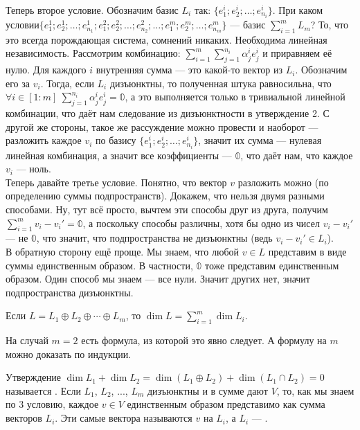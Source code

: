 \documentclass{article}
\begin{document}
\begin{itemize}
\begin{Proof}
            Теперь второе условие. Обозначим базис $L_i$ так: $\{e^i_1;e^i_2;\ldots;e^i_{n_i}\}$. При каком условии\newline$\{e^1_1;e^1_2;\ldots;e^1_{n_1};e^2_1;e^2_2;\ldots;e^2_{n_2};\ldots;e^m_1;e^m_2;\ldots;e^m_{n_m}\}$ --- базис $\sum\limits_{i=1}^mL_m$? То, что это всегда порождающая система, сомнений никаких. Необходима линейная независимость. Рассмотрим комбинацию: $\sum\limits_{i=1}^m\sum\limits_{j=1}^{n_i}\alpha_j^ie_j^i$ и приравняем её нулю. Для каждого $i$ внутренняя сумма --- это какой-то вектор из $L_i$. Обозначим его за $v_i$. Тогда, если $L_i$ дизъюнктны, то полученная штука равносильна, что $\forall i\in[1:m]~\sum\limits_{j=1}^{n_i}\alpha_j^ie_j^i=\mathbb0$, а это выполняется только в тривиальной линейной комбинации, что даёт нам следование из дизъюнктности в утверждение 2. С другой же стороны, такое же рассуждение можно провести и наоборот --- разложить каждое $v_i$ по базису $\{e_1^i;e_2^i;\ldots;e^i_{n_i}\}$, значит их сумма --- нулевая линейная комбинация, а значит все коэффициенты --- $\mathbb0$, что даёт нам, что каждое $v_i$ --- ноль.\\
            Теперь давайте третье условие. Понятно, что вектор $v$ разложить можно (по определению суммы подпространств). Докажем, что нельзя двумя разными способами. Ну, тут всё просто, вычтем эти способы друг из друга, получим $\sum\limits_{i=1}^mv_i-v_i'=\mathbb0$, а поскольку способы различны, хотя бы одно из чисел $v_i-v_i'$ --- не $\mathbb0$, что значит, что подпространства не дизъюнктны (ведь $v_i-v_i'\in L_i$).\\
            В обратную сторону ещё проще. Мы знаем, что любой $v\in L$ представим в виде суммы единственным образом. В частности, $\mathbb0$ тоже представим единственным образом. Один способ мы знаем --- все нули. Значит других нет, значит подпространства дизъюнктны.
        \end{Proof}
        \thm Если $L=L_1\oplus L_2\oplus\cdots\oplus L_m$, то $\dim L=\sum\limits_{i=1}^m\dim L_i$.
        \begin{Proof}
            На случай $m=2$ есть формула, из которой это явно следует. А формулу на $m$ можно доказать по индукции.
        \end{Proof}
        \thm Утверждение $\dim L_1+\dim L_2=\dim(L_1\oplus L_2)+\dim(L_1\cap L_2)=0$ называется .
        \dfn Если $L_1$, $L_2$, ..., $L_m$ дизъюнктны и в сумме дают $V$, то, как мы знаем по 3 условию, каждое $v\in V$ единственным образом представимо как сумма векторов $L_i$. Эти самые вектора называются  $v$ на $L_i$, а $L_i$ --- .

\end{itemize}
\end{document}

